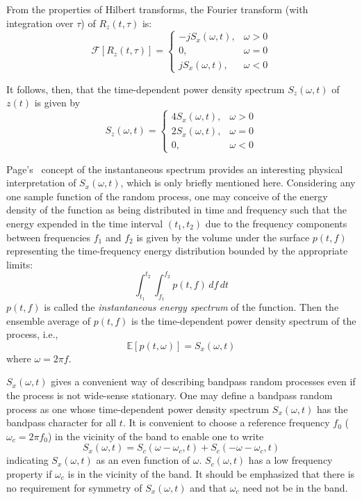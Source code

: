 \documentclass[12pt]{article}
\begin{document}
From the properties of Hilbert transforms, the Fourier transform (with integration over $\tau$) of $R_z(t, \tau)$ is:
\begin{equation}
\mathcal{F}[R_z(t, \tau)] = 
\begin{cases}
-j S_x(\omega, t), & \omega > 0 \\
0, & \omega = 0 \\
j S_x(\omega, t), & \omega < 0
\end{cases}
\label{eq:hilbert_fourier}
\end{equation}

It follows, then, that the time-dependent power density spectrum $S_z(\omega, t)$ of $z(t)$ is given by
\begin{equation}
S_z(\omega, t) = 
\begin{cases}
4 S_x(\omega, t), & \omega > 0 \\
2 S_x(\omega, t), & \omega = 0 \\
0, & \omega < 0
\end{cases}
\label{eq:preenvelope_spectrum}
\end{equation}

Page's~\cite{page1952, kharkevich1960} concept of the instantaneous spectrum provides an interesting physical interpretation of $S_x(\omega, t)$, which is only briefly mentioned here. Considering any one sample function of the random process, one may conceive of the energy density of the function as being distributed in time and frequency such that the energy expended in the time interval $(t_1, t_2)$ due to the frequency components between frequencies $f_1$ and $f_2$ is given by the volume under the surface $p(t, f)$ representing the time-frequency energy distribution bounded by the appropriate limits:
\begin{equation}
\int_{t_1}^{t_2} \int_{f_1}^{f_2} p(t, f) \, df \, dt
\label{eq:energy_density}
\end{equation}
$p(t, f)$ is called the \emph{instantaneous energy spectrum} of the function. Then the ensemble average of $p(t, f)$ is the time-dependent power density spectrum of the process, i.e.,
\begin{equation}
\mathbb{E}[p(t, \omega)] = S_x(\omega, t)
\label{eq:ensemble_energy}
\end{equation}
where $\omega = 2\pi f$.

$S_x(\omega, t)$ gives a convenient way of describing bandpass random processes even if the process is not wide-sense stationary. One may define a bandpass random process as one whose time-dependent power density spectrum $S_x(\omega, t)$ has the bandpass character for all $t$. It is convenient to choose a reference frequency $f_0$ ($\omega_c = 2\pi f_0$) in the vicinity of the band to enable one to write
\begin{equation}
S_x(\omega, t) = S_c(\omega - \omega_c, t) + S_c(-\omega - \omega_c, t)
\label{eq:bandpass_spectrum}
\end{equation}
indicating $S_x(\omega, t)$ as an even function of $\omega$. $S_c(\omega, t)$ has a low frequency property if $\omega_c$ is in the vicinity of the band. It should be emphasized that there is no requirement for symmetry of $S_x(\omega, t)$ and that $\omega_c$ need not be in the band.
\end{document}
